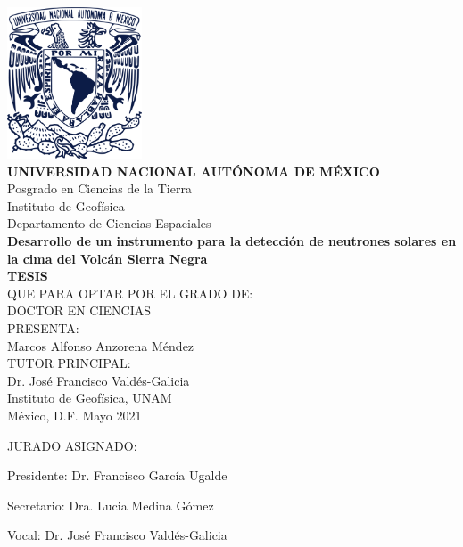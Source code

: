 \begin{titlepage}

\begin{center}

	\vspace{-1cm}
  \includegraphics[height=4.5cm]{unam.pdf}\\[20pt]
	\textbf{\Large UNIVERSIDAD NACIONAL AUTÓNOMA DE MÉXICO}\\
	\large Posgrado en Ciencias de la Tierra\\
	\large Instituto de Geofísica\\
	\large Departamento de Ciencias Espaciales\\[35pt]
	\textbf{\Large Desarrollo de un instrumento para la detección de neutrones solares en la cima
	del Volcán Sierra Negra}\\[40pt]
	\textbf{\Large TESIS}\\[10pt]
  \large QUE PARA OPTAR POR EL GRADO DE:\\
  \large DOCTOR EN CIENCIAS\\[25pt]
  \large PRESENTA:\\
	\large  Marcos Alfonso Anzorena Méndez\\[30pt]
  \large TUTOR PRINCIPAL:\\
  \large  Dr. José Francisco Valdés-Galicia\\
  \large  Instituto de Geofísica, UNAM\\[35pt]
  México, D.F. Mayo 2021

\end{center}

\newpage

\thispagestyle{empty}
\setlength{\parskip}{5pt}

	\Large JURADO ASIGNADO:

	\vspace*{35pt}
	\large Presidente: Dr. Francisco García Ugalde

	\large Secretario: Dra. Lucia Medina Gómez

	\large Vocal: Dr. José Francisco Valdés-Galicia


\end{titlepage}
